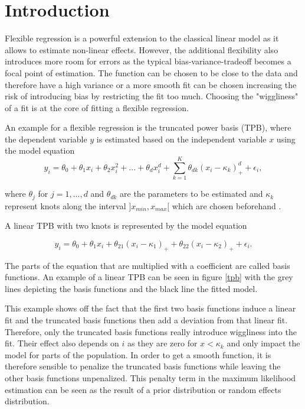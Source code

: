 \documentclass[12pt]{article}
\begin{document}
\begin{titlepage}
\clearpage
\end{titlepage}

\setcounter{page}{2}
\tableofcontents
\clearpage

\section{Introduction}

Flexible regression is a powerful extension to the classical linear model as it allows to estimate non-linear effects. However, the additional flexibility also introduces more room for errors as the typical bias-variance-tradeoff becomes a focal point of estimation. The function can be chosen to be close to the data and therefore have a high variance or a more smooth fit can be chosen increasing the risk of introducing bias by restricting the fit too much. Choosing the "wiggliness" of a fit is at the core of fitting a flexible regression.

An example for a flexible regression is the truncated power basis (TPB), where the dependent variable $y$ is estimated based on the independent variable $x$ using the model equation
$$y_i = 
 \theta_0 + \theta_1x_i + \theta_2x_i^2 + ... + \theta_dx_i^d + \sum_{k=1}^K \theta_{dk}(x_i-\kappa_k)_+^d + \epsilon_i,$$
 
 where $\theta_j$ for $j= 1,...,d$ and $\theta_{dk}$ are the parameters to be estimated and $\kappa_k$ represent knots along the interval $]x_{min},x_{max}[$ which are chosen beforehand \cite{ruppert2003semiparametric, wand2003smoothing}.
 
  A linear TPB with two knots is represented by the model equation
 
 $$y_i = 
 \theta_0 + \theta_1x_i +  \theta_{21}(x_i-\kappa_1)_+ + \theta_{22}(x_i-\kappa_2)_+ + \epsilon_i.$$
 
 The parts of the equation that are multiplied with a coefficient are called basis functions. 
An example of a linear TPB can be seen in figure \ref{tpb} with the grey lines depicting the basis functions and the black line the fitted model.
 
This example shows off the fact that the first two basis functions induce a linear fit and the truncated basis functions then add a deviation from that linear fit. Therefore, only the truncated basis functions really introduce wiggliness into the fit. 
Their effect also depends on $i$ as they are zero for $x<\kappa_k$ and only impact the model for parts of the population. 
In order to get a smooth function, it is therefore sensible to penalize the truncated basis functions while leaving the other basis functions unpenalized. This penalty term in the maximum likelihood estimation can be seen as the result of a prior distribution or random effects distribution. 
\end{document}
